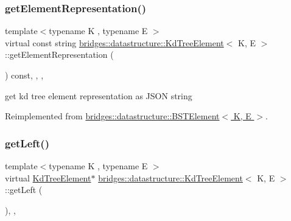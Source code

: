 \mbox{\label{classbridges_1_1datastructure_1_1_kd_tree_element_a5413ecaf152e3df5fb45dd85da812888}} 
\subsubsection{\texorpdfstring{get\+Element\+Representation()}{getElementRepresentation()}}
{\footnotesize\ttfamily template$<$typename K , typename E $>$ \\
virtual const string \hyperlink{classbridges_1_1datastructure_1_1_kd_tree_element}{bridges\+::datastructure\+::\+Kd\+Tree\+Element}$<$ K, E $>$\+::get\+Element\+Representation (\begin{DoxyParamCaption}{ }\end{DoxyParamCaption}) const\hspace{0.3cm}{\ttfamily [inline]}, {\ttfamily [override]}, {\ttfamily [protected]}, {\ttfamily [virtual]}}



get kd tree element representation as J\+S\+ON string 



Reimplemented from \hyperlink{classbridges_1_1datastructure_1_1_b_s_t_element_a8f962a01b6e0eff59abeee7768264fd9}{bridges\+::datastructure\+::\+B\+S\+T\+Element$<$ K, E $>$}.

\mbox{\label{classbridges_1_1datastructure_1_1_kd_tree_element_a875bfa2dfd88a7740f7bcd28a117c12a}} 
\subsubsection{\texorpdfstring{get\+Left()}{getLeft()}\hspace{0.1cm}{\footnotesize\ttfamily [1/2]}}
{\footnotesize\ttfamily template$<$typename K , typename E $>$ \\
virtual \hyperlink{classbridges_1_1datastructure_1_1_kd_tree_element}{Kd\+Tree\+Element}$\ast$ \hyperlink{classbridges_1_1datastructure_1_1_kd_tree_element}{bridges\+::datastructure\+::\+Kd\+Tree\+Element}$<$ K, E $>$\+::get\+Left (\begin{DoxyParamCaption}{ }\end{DoxyParamCaption})\hspace{0.3cm}{\ttfamily [inline]}, {\ttfamily [override]}, {\ttfamily [virtual]}}



